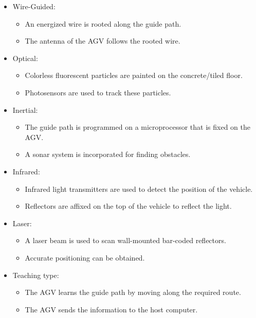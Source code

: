 \begin{itemize}
    \item Wire-Guided:
    \begin{itemize}
    \item An energized wire is rooted along the guide path. 
    \item The antenna of the AGV follows the rooted wire.
    \end{itemize}
    \item Optical:
    \begin{itemize}
    \item Colorless fluorescent particles are painted on the concrete/tiled floor. 
    \item Photosensors are used to track these particles.
    \end{itemize}
    \item Inertial:
    \begin{itemize}
    \item The guide path is programmed on a microprocessor that is fixed on the AGV. 
    \item A sonar system is incorporated for finding obstacles.
    \end{itemize}
    \item Infrared:
    \begin{itemize}
    \item Infrared light transmitters are used to detect the position of the vehicle.
    \item Reflectors are affixed on the top of the vehicle to reflect the light.
    \end{itemize}
    \item Laser:
    \begin{itemize}
    \item A laser beam is used to scan wall-mounted bar-coded reflectors.
    \item Accurate positioning can be obtained.
    \end{itemize}
    \item Teaching type:
    \begin{itemize}
    \item The AGV learns the guide path by moving along the required route.
    \item The AGV sends the information to the host computer.
    \end{itemize}
\end{itemize}


